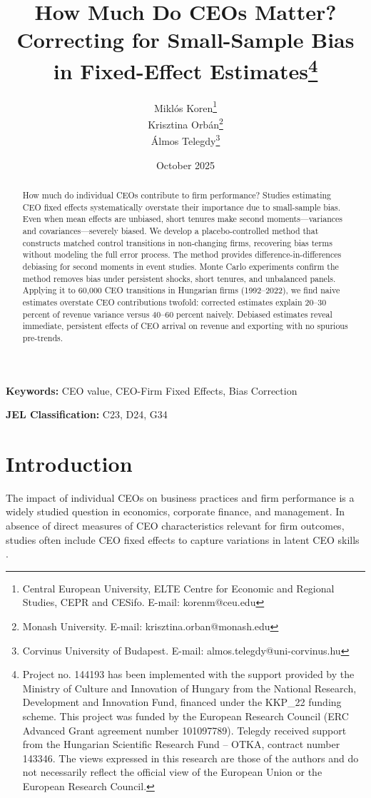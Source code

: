 \documentclass[11pt,a4paper]{article}
\title{How Much Do CEOs Matter? Correcting for Small-Sample Bias in Fixed-Effect Estimates\thanks{Project no. 144193 has been implemented with the support provided by the Ministry of Culture and Innovation of Hungary from the National Research, Development and Innovation Fund, financed under the KKP\_22 funding scheme. This project was funded by the European Research Council (ERC Advanced Grant agreement number 101097789). Telegdy received support from the Hungarian Scientific Research Fund – OTKA, contract number 143346. The views expressed in this research are those of the authors and do not necessarily reflect the official view of the European Union or the European Research Council.}}
\author{Miklós Koren\thanks{Central European University, ELTE Centre for Economic and Regional Studies, CEPR and CESifo. E-mail: korenm@ceu.edu} \\
        Krisztina Orbán\thanks{Monash University. E-mail: krisztina.orban@monash.edu} \\
        Álmos Telegdy\thanks{Corvinus University of Budapest. E-mail: almos.telegdy@uni-corvinus.hu}}
\date{October 2025}
\begin{document}
\maketitle
\thispagestyle{empty}

\begin{abstract}
How much do individual CEOs contribute to firm performance? Studies estimating CEO fixed effects systematically overstate their importance due to small-sample bias. Even when mean effects are unbiased, short tenures make second moments---variances and covariances---severely biased. We develop a placebo-controlled method that constructs matched control transitions in non-changing firms, recovering bias terms without modeling the full error process. The method provides difference-in-differences debiasing for second moments in event studies. Monte Carlo experiments confirm the method removes bias under persistent shocks, short tenures, and unbalanced panels. Applying it to 60,000 CEO transitions in Hungarian firms (1992--2022), we find naive estimates overstate CEO contributions twofold: corrected estimates explain 20--30 percent of revenue variance versus 40--60 percent naively. Debiased estimates reveal immediate, persistent effects of CEO arrival on revenue and exporting with no spurious pre-trends.
\end{abstract}

\textbf{Keywords:} CEO value, CEO-Firm Fixed Effects, Bias Correction

\textbf{JEL Classification:} C23, D24, G34

\clearpage
\setcounter{page}{1}

\section{Introduction}

The impact of individual CEOs on business practices and firm performance is a widely studied question in economics, corporate finance, and management. In absence of direct measures of CEO characteristics relevant for firm outcomes, studies often include CEO fixed effects to capture variations in latent CEO skills \citep{Bertrand2003-io, crossland2011differences, quigley2015has}. 
\end{document}
